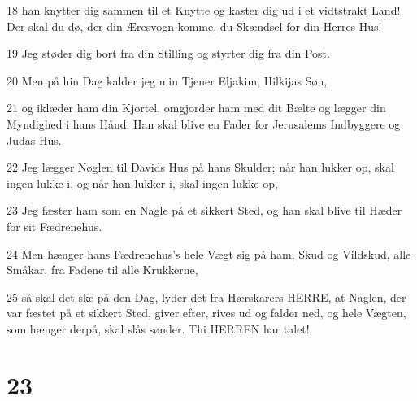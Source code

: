 \par 18 han knytter dig sammen til et Knytte og kaster dig ud i et vidtstrakt Land! Der skal du dø, der din Æresvogn komme, du Skændsel for din Herres Hus!
\par 19 Jeg støder dig bort fra din Stilling og styrter dig fra din Post.
\par 20 Men på hin Dag kalder jeg min Tjener Eljakim, Hilkijas Søn,
\par 21 og iklæder ham din Kjortel, omgjorder ham med dit Bælte og lægger din Myndighed i hans Hånd. Han skal blive en Fader for Jerusalems Indbyggere og Judas Hus.
\par 22 Jeg lægger Nøglen til Davids Hus på hans Skulder; når han lukker op, skal ingen lukke i, og når han lukker i, skal ingen lukke op,
\par 23 Jeg fæster ham som en Nagle på et sikkert Sted, og han skal blive til Hæder for sit Fædrenehus.
\par 24 Men hænger hans Fædrenehus's hele Vægt sig på ham, Skud og Vildskud, alle Småkar, fra Fadene til alle Krukkerne,
\par 25 så skal det ske på den Dag, lyder det fra Hærskarers HERRE, at Naglen, der var fæstet på et sikkert Sted, giver efter, rives ud og falder ned, og hele Vægten, som hænger derpå, skal slås sønder. Thi HERREN har talet!

\chapter{23}

